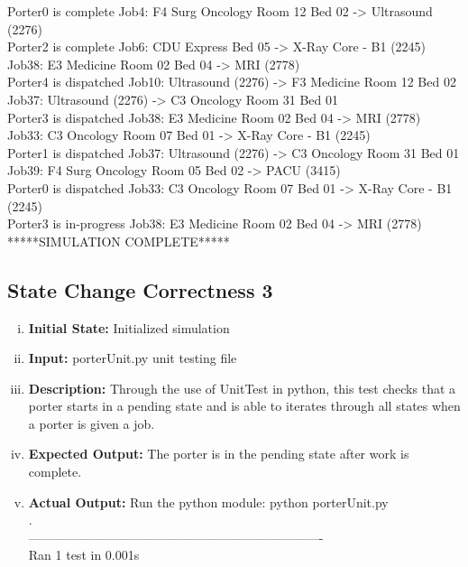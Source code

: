 \documentclass[paper=letter, fontsize=10pt]{scrartcl}
\numberwithin{equation}{section}		%
\numberwithin{figure}{section}			%
\numberwithin{table}{section}				%
\begin{document}
\begin{enumerate}[(i)]
\begin{enumerate}[(i)]
Porter0 is complete Job4: F4 Surg Oncology Room 12 Bed 02 -> Ultrasound (2276)\\
Porter2 is complete Job6: CDU Express Bed 05 -> X-Ray Core - B1 (2245)\\
Job38: E3 Medicine Room 02 Bed 04 -> MRI (2778)\\
Porter4 is dispatched Job10: Ultrasound (2276) -> F3 Medicine Room 12 Bed 02\\
Job37: Ultrasound (2276) -> C3 Oncology Room 31 Bed 01\\
Porter3 is dispatched Job38: E3 Medicine Room 02 Bed 04 -> MRI (2778)\\
Job33: C3 Oncology Room 07 Bed 01 -> X-Ray Core - B1 (2245)\\
Porter1 is dispatched Job37: Ultrasound (2276) -> C3 Oncology Room 31 Bed 01\\
Job39: F4 Surg Oncology Room 05 Bed 02 -> PACU (3415)\\
Porter0 is dispatched Job33: C3 Oncology Room 07 Bed 01 -> X-Ray Core - B1 (2245)\\
Porter3 is in-progress Job38: E3 Medicine Room 02 Bed 04 -> MRI (2778)\\
*****SIMULATION COMPLETE*****\\
\end{enumerate}

\subsection{State Change Correctness 3}
\begin{enumerate}[(i)]
		\item \textbf{Initial State:} Initialized simulation
		\item \textbf{Input:} porterUnit.py unit testing file
		\item \textbf{Description:} Through the use of UnitTest in python, this test checks that a porter starts in a pending state and is able to iterates through all states when a porter is given a job.
		\item \textbf{Expected Output:} The porter is in the pending state after work is complete.
		\item \textbf{Actual Output:} Run the python module: python porterUnit.py\\
.\\
----------------------------------------------------------------------\\
Ran 1 test in 0.001s\\


\end{enumerate}
\end{enumerate}
\end{document}
